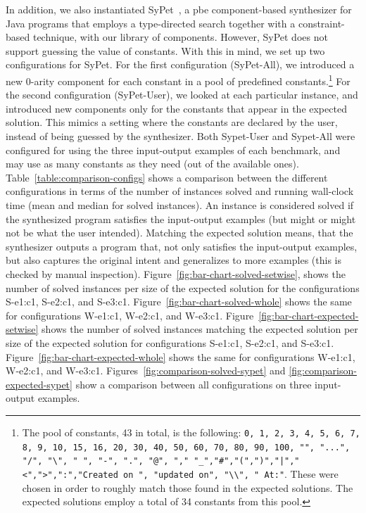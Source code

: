 In addition, we also instantiated SyPet~\cite{Feng:2017:CSC}, a
\gls{pbe} component-based synthesizer for Java programs that employs a
type-directed search together with a constraint-based technique, with our
library of components.
However, SyPet does not support guessing the value of constants.
With this in mind, we set up two configurations for SyPet.
For the first configuration (SyPet-All), we introduced a new 0-arity component
for each constant in a pool of predefined constants.\footnote{The pool of
constants, 43 in total, is the following: \lstinline{0, 1, 2, 3, 4, 5, 6, 7, 8,
9, 10, 15, 16, 20, 30, 40, 50, 60, 70, 80, 90, 100, "", "...", "/", "\", " ",
"-", ".", "@", "," "_","#","(",")","|","<",">",":","Created on ", "updated on",
"\\", " At:"}. These were chosen in order to roughly match those found in the
expected solutions. The expected solutions employ a total of 34 constants from
this pool.}
For the second configuration (SyPet-User), we looked at each particular
instance, and introduced new components only for the constants that appear in
the expected solution.
This mimics a setting where the constants are declared by the user, instead of
being guessed by the synthesizer.
Both Sypet\nobreakdash-User and Sypet-All were configured for using the three
input-output examples of each benchmark, and may use as many constants as they
need (out of the available ones).
Table~\ref{table:comparison-configs} shows a comparison between the different
configurations in terms of the number of instances solved and running wall-clock
time (mean and median for solved instances).
An instance is considered solved if the synthesized program satisfies the
input-output examples (but might or might not be what the user intended).
Matching the expected solution means, that the synthesizer outputs a program
that, not only satisfies the input-output examples, but also captures the
original intent and generalizes to more examples (this is checked by manual
inspection).
Figure~\ref{fig:bar-chart-solved-setwise}, shows the number of solved instances
per size of the expected solution for the configurations S-e1:c1, S-e2:c1, and
S-e3:c1.
Figure~\ref{fig:bar-chart-solved-whole} shows the same for configurations
W-e1:c1, W-e2:c1, and W-e3:c1.
Figure~\ref{fig:bar-chart-expected-setwise} shows the number of solved instances
matching the expected solution per size of the expected solution for
configurations S-e1:c1, S-e2:c1, and S-e3:c1.
Figure~\ref{fig:bar-chart-expected-whole} shows the same for configurations
W-e1:c1, W-e2:c1, and W-e3:c1.
Figures~\ref{fig:comparison-solved-sypet} and
\ref{fig:comparison-expected-sypet} show a comparison between all configurations
on three input-output examples.

